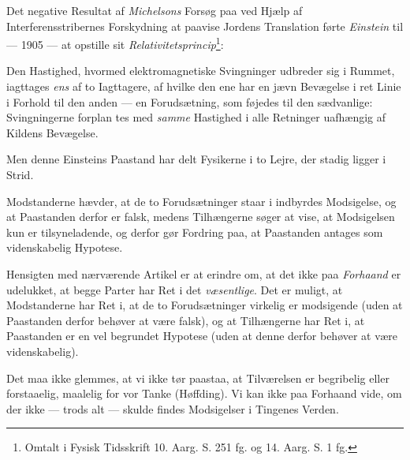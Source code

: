 \documentclass[12pt,a4paper]{article}
\newcommand{\opage}[1]{\marginnote{\footnotesize\textit{[#1]}}}
\begin{document}
\opage{13} %
\setcounter{footnote}{1}%

Det negative Resultat af \emph{Michelsons} Forsøg paa ved Hjælp af
Interferensstribernes Forskydning at paavise Jordens Translation førte
\emph{Einstein} til --- 1905 --- at opstille sit
\guillemotright\emph{Relativitetsprincip}\footnote{Omtalt i Fysisk
Tidsskrift 10. Aarg. S. 251 fg. og 14. Aarg. S. 1 fg.}:

Den Hastighed, hvormed elektromagnetiske Svingninger udbreder sig i
Rummet, iagttages \emph{ens} af to Iagttagere, af hvilke den ene har en
jævn Bevægelse i ret Linie i Forhold til den anden --- en Forudsætning,
som føjedes til den sædvanlige: Svingningerne forplan\-%
\opage{14}tes med \emph{samme} Hastighed i alle Retninger uafhængig af Kildens
Bevægelse.

Men denne Einsteins Paastand har delt Fysikerne i to Lejre, der stadig
ligger i Strid.

Modstanderne hævder, at de to Forudsætninger staar i indbyrdes
Modsigelse, og at Paastanden derfor er falsk, medens Tilhængerne søger at
vise, at Modsigelsen kun er tilsyneladende, og derfor gør Fordring paa,
at Paastanden antages som videnskabelig Hypotese.

Hensigten med nærværende Artikel er at erindre om, at det ikke paa
\emph{Forhaand} er udelukket, at begge Parter har Ret i det
\emph{væsentlige}. Det er muligt, at Modstanderne har Ret i, at de to
Forudsætninger virkelig er modsigende (uden at Paastanden derfor behøver
at være falsk), og at Tilhængerne har Ret i, at Paastanden er en vel
begrundet Hypotese (uden at denne derfor behøver at være videnskabelig).

Det maa ikke glemmes, at vi ikke tør paastaa, at Tilværelsen er
\guillemotright begribelig eller forstaaelig, maalelig for vor
Tanke\guillemotleft{} (Høffding). Vi kan ikke paa Forhaand vide, om der
ikke --- trods alt --- skulde findes Modsigelser i Tingenes Verden.
\end{document}
